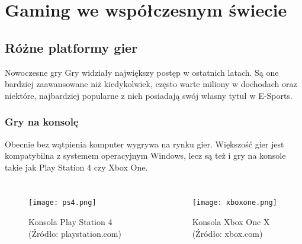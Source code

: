 \documentclass{beamer}
\begin{document}
\section{Gaming we współczesnym świecie}
\subsection{Różne platformy gier}

{
\begin{frame}
    \begin{block}{Nowoczesne gry}
    Gry widziały największy postęp w ostatnich latach. Są one bardziej zaawansowane niż kiedykolwiek, często warte miliony w dochodach oraz niektóre, najbardziej popularne z nich posiadają swój własny tytuł w E-Sports.
    \end{block}
\end{frame}
}


\begin{frame}
\frametitle{Gry na konsolę}
    Obecnie bez wątpienia komputer wygrywa na rynku gier. Większość gier jest kompatybilna z systemem operacyjnym Windows, lecz są też i gry na konsole takie jak Play Station 4 czy Xbox One.
    \break
    \begin{columns}
            \begin{figure}
                \texttt{[image: ps4.png]}
                \caption{Konsola Play Station 4 (Źródło: playstation.com)}
            \end{figure}
            \begin{figure}
                \texttt{[image: xboxone.png]}
                \caption{Konsola Xbox One X (Źródło: xbox.com)}
            \end{figure}
    \end{columns}
\end{frame}

\end{document}
